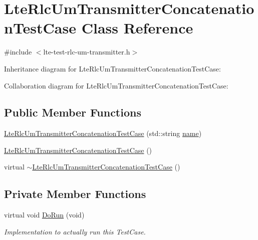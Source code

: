 \hypertarget{classLteRlcUmTransmitterConcatenationTestCase}{}\section{Lte\+Rlc\+Um\+Transmitter\+Concatenation\+Test\+Case Class Reference}
\label{classLteRlcUmTransmitterConcatenationTestCase}


{\ttfamily \#include $<$lte-\/test-\/rlc-\/um-\/transmitter.\+h$>$}



Inheritance diagram for Lte\+Rlc\+Um\+Transmitter\+Concatenation\+Test\+Case\+:


Collaboration diagram for Lte\+Rlc\+Um\+Transmitter\+Concatenation\+Test\+Case\+:
\subsection*{Public Member Functions}
\begin{DoxyCompactItemize}
\item 
\hyperlink{classLteRlcUmTransmitterConcatenationTestCase_aad28788b798c02c5e03e22c0e8e44e46}{Lte\+Rlc\+Um\+Transmitter\+Concatenation\+Test\+Case} (std\+::string \hyperlink{generate__test__data__lte__spectrum__model_8m_ab74e6bf80237ddc4109968cedc58c151}{name})
\item 
\hyperlink{classLteRlcUmTransmitterConcatenationTestCase_ae34cd29410eea3e93335b4d744f2fc87}{Lte\+Rlc\+Um\+Transmitter\+Concatenation\+Test\+Case} ()
\item 
virtual \hyperlink{classLteRlcUmTransmitterConcatenationTestCase_a8a1ac5be001733ed630e55c095e9e935}{$\sim$\+Lte\+Rlc\+Um\+Transmitter\+Concatenation\+Test\+Case} ()
\end{DoxyCompactItemize}
\subsection*{Private Member Functions}
\begin{DoxyCompactItemize}
\item 
virtual void \hyperlink{classLteRlcUmTransmitterConcatenationTestCase_a36dc51a9323fe7462cdef148508b0e98}{Do\+Run} (void)
\begin{DoxyCompactList}\small\item\em Implementation to actually run this Test\+Case. \end{DoxyCompactList}\end{DoxyCompactItemize}
